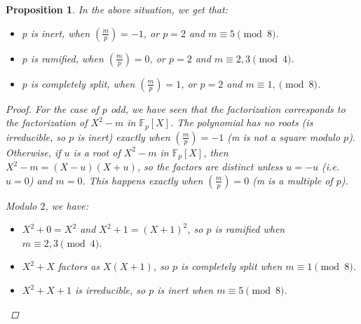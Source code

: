 \documentclass[11pt]{article}
\newtheorem{prop}{Proposition}
\theoremstyle{definition}
\begin{document}
    \begin{prop}

        In the above situation, we get that:

        \begin{itemize}
            \item $p$ is inert, when $\left(\frac{m}{p}\right) = -1$, or $p=2$ and $m \equiv 5 \pmod 8$.
            \item $p$ is ramified, when $\left(\frac{m}{p}\right) = 0$, or $p=2$ and $m \equiv 2, 3 \pmod 4$.
            \item $p$ is completely split, when $\left(\frac{m}{p}\right) = 1$, or $p=2$ and $m \equiv 1, \pmod 8$.
        \end{itemize}

        \begin{proof}
            For the case of $p$ odd, we have seen that the factorization corresponds to the factorization of $X^2-m$ in $\mathbb{F}_p[X]$.
            The polynomial has no roots (is irreducible, so $p$ is inert) exactly when $\left(\frac{m}{p}\right) = -1$ (m is not a square modulo $p$).
            Otherwise, if $u$ is a root of $X^2-m$ in $\mathbb{F}_p[X]$, then $X^2-m = (X-u)(X+u)$, so the factors are distinct unless $u = -u$ (i.e. $u = 0$) and $m = 0$.
            This happens exactly when $\left(\frac{m}{p}\right) = 0$ (m is a multiple of $p$).

            \textcolor{white}{}

            \noindent Modulo $2$, we have:
            \begin{itemize}
                \item $X^2+0 = X^2$ and  $X^2+1 = (X+1)^2$, so $p$ is ramified when $m \equiv 2, 3 \pmod 4$.
                \item $X^2+X$ factors as $X(X+1)$, so $p$ is completely split when $m \equiv 1 \pmod 8$.
                \item $X^2+X+1$ is irreducible, so $p$ is inert when $m \equiv 5 \pmod 8$.
            \end{itemize}
        \end{proof}
    \end{prop}
\end{document}
